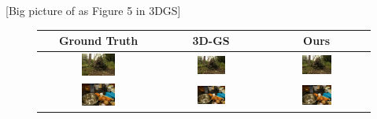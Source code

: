 \documentclass[12pt]{report}
\begin{document}
[Big picture of as Figure 5 in 3DGS]

\begin{figure}[h]
    \centering
    \begin{tabular}{ccc}
        \textbf{Ground Truth} & \textbf{3D-GS} & \textbf{Ours} \\ \hline
        \includegraphics[width=0.3\textwidth]{../o-3dgs/eval/stump/test/ours_30000/gt/00000.png} & 
        \includegraphics[width=0.3\textwidth]{../o-3dgs/eval/stump/test/ours_30000/renders/00000.png} & 
        \includegraphics[width=0.3\textwidth]{../o-3dgs/eval/stump/test/ours_30000/renders/00000.png} \\
        \includegraphics[width=0.3\textwidth]{../o-3dgs/eval/counter/test/ours_30000/gt/00000.png} & 
        \includegraphics[width=0.3\textwidth]{../o-3dgs/eval/counter/test/ours_30000/renders/00000.png} & 
        \includegraphics[width=0.3\textwidth]{../o-3dgs/eval/counter/test/ours_30000/renders/00000.png} \\

\end{tabular}
\end{figure}
\end{document}
